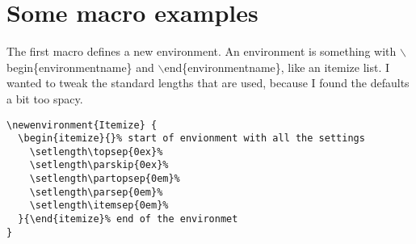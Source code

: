 \chapter{Some macro examples}

The first macro defines a new environment.
An environment is something with $\backslash$begin\{environmentname\} and $\backslash$end\{environmentname\}, like an itemize list.
I wanted to tweak the standard lengths that are used, because I found the defaults a bit too spacy.

\begin{lstlisting}[caption={Tighter itemize}]
\newenvironment{Itemize} {
  \begin{itemize}{}% start of envionment with all the settings
    \setlength\topsep{0ex}%
    \setlength\parskip{0ex}%
    \setlength\partopsep{0em}%
    \setlength\parsep{0em}%
    \setlength\itemsep{0em}%
  }{\end{itemize}% end of the environmet
}
\end{lstlisting}

